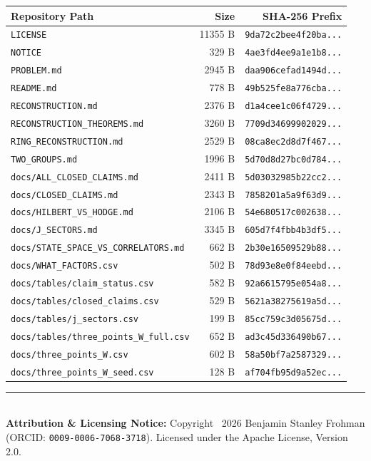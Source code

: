 \documentclass[11pt,a4paper]{article}
\begin{document}
\begin{center}
\small
\begin{tabular}{p{}rr}
\toprule
\textbf{Repository Path} & \textbf{Size} & \textbf{SHA-256 Prefix} \\
\midrule
\texttt{LICENSE} & 11355 B & \texttt{9da72c2bee4f20ba...} \\
\texttt{NOTICE} & 329 B & \texttt{4ae3fd4ee9a1e1b8...} \\
\texttt{PROBLEM.md} & 2945 B & \texttt{daa906cefad1494d...} \\
\texttt{README.md} & 778 B & \texttt{49b525fe8a776cba...} \\
\texttt{RECONSTRUCTION.md} & 2376 B & \texttt{d1a4cee1c06f4729...} \\
\texttt{RECONSTRUCTION\_THEOREMS.md} & 3260 B & \texttt{7709d34699902029...} \\
\texttt{RING\_RECONSTRUCTION.md} & 2529 B & \texttt{08ca8ec2d8d7f467...} \\
\texttt{TWO\_GROUPS.md} & 1996 B & \texttt{5d70d8d27bc0d784...} \\
\texttt{docs/ALL\_CLOSED\_CLAIMS.md} & 2411 B & \texttt{5d03032985b22cc2...} \\
\texttt{docs/CLOSED\_CLAIMS.md} & 2343 B & \texttt{7858201a5a9f63d9...} \\
\texttt{docs/HILBERT\_VS\_HODGE.md} & 2106 B & \texttt{54e680517c002638...} \\
\texttt{docs/J\_SECTORS.md} & 3345 B & \texttt{605d7f4fbb4b3df5...} \\
\texttt{docs/STATE\_SPACE\_VS\_CORRELATORS.md} & 662 B & \texttt{2b30e16509529b88...} \\
\texttt{docs/WHAT\_FACTORS.csv} & 502 B & \texttt{78d93e8e0f84eebd...} \\
\texttt{docs/tables/claim\_status.csv} & 582 B & \texttt{92a6615795e054a8...} \\
\texttt{docs/tables/closed\_claims.csv} & 529 B & \texttt{5621a38275619a5d...} \\
\texttt{docs/tables/j\_sectors.csv} & 199 B & \texttt{85cc759c3d05675d...} \\
\texttt{docs/tables/three\_points\_W\_full.csv} & 652 B & \texttt{ad3c45d336490b67...} \\
\texttt{docs/three\_points\_W.csv} & 602 B & \texttt{58a50bf7a2587329...} \\
\texttt{docs/three\_points\_W\_seed.csv} & 128 B & \texttt{af704fb95d9a52ec...} \\
\bottomrule
\end{tabular}
\end{center}

\vfill
\noindent\rule{\textwidth}{0.4pt}\\
\footnotesize
\textbf{Attribution \& Licensing Notice:} Copyright \textcopyright\ 2026 Benjamin Stanley Frohman (ORCID: \texttt{0009-0006-7068-3718}).
Licensed under the Apache License, Version 2.0.
\end{document}
